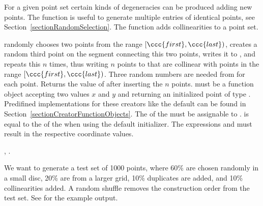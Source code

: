 
For a given point set certain kinds of degeneracies can be produced
adding new points. The  function is
useful to generate multiple entries of identical points, see
Section~\ref{sectionRandomSelection}. The
 function adds collinearities to
a point set.


\def\ccLongParamLayout{\ccTrue}
{ randomly chooses two points from the range $[\ccc{first},\ccc{last})$,
    creates a random third point on the segment connecting this two
    points, writes it to , and repeats this $n$ times, thus
    writing $n$ points to  that are collinear with points
    in the range $[\ccc{first},\ccc{last})$.
    Three random numbers are needed from  for each point.
    Returns the value of  after inserting the $n$ points.
  \ccPrecond  {} must be a function object accepting two
     values $x$ and $y$ and returning an initialized point
     of type . Predifined implementations for these
    creators like the default can be found in
    Section~\ref{sectionCreatorFunctionObjects}. The  of the
     must be assignable to .
     is equal to the  of the
     when using the default initializer.
    The expressions  and
     must result in the respective
    coordinate values.
}
\def\ccLongParamLayout{\ccFalse}


\ccSeeAlso

, .

\ccExample

We want to generate a test set of 1000 points, where 60\% are chosen
randomly in a small disc, 20\% are from a larger grid, 10\% duplicates
are added, and 10\% collinearities added. A random shuffle removes the
construction order from the test set. See  for the example output.

